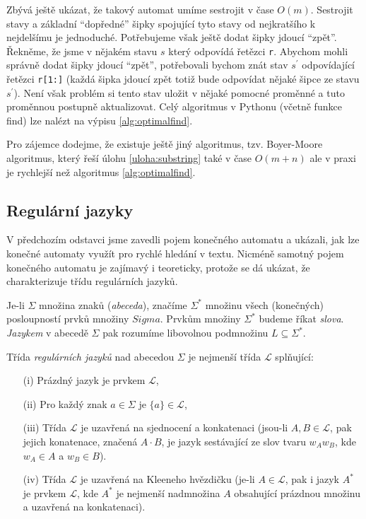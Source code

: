 Zbývá ještě ukázat, že takový automat umíme sestrojit v čase \(O(m)\).  Sestrojit stavy
a základní ``dopředné'' šipky spojující tyto stavy od nejkratšího k nejdelšímu je jednoduché.
Potřebujeme však ještě dodat šipky jdoucí ``zpět''.  Řekněme, že jsme  v nějakém stavu \(s\) 
který odpovídá řetězci {\tt r}. Abychom mohli správně dodat šipky jdoucí ``zpět'', potřebovali
bychom znát stav \(s^\prime\) odpovídající řetězci {\tt r[1:]} (každá šipka jdoucí zpět totiž bude 
odpovídat nějaké šipce ze stavu \(s^\prime\)). Není však problém si tento stav uložit v nějaké
pomocné proměnné a tuto proměnnou postupně aktualizovat.  Celý algoritmus v Pythonu
(včetně funkce find) lze nalézt na výpisu \ref{alg:optimalfind}.


Pro zájemce dodejme, že existuje ještě jiný algoritmus, tzv. Boyer-Moore algoritmus, 
který řeší úlohu \ref{uloha:substring} také v čase \(O(m+n)\) ale v praxi je rychlejší než 
algoritmus \ref{alg:optimalfind}.

\subsection*{Regulární jazyky}

V předchozím odstavci jsme zavedli pojem konečného automatu a ukázali, jak lze konečné
automaty využít pro rychlé hledání v textu. Nicméně samotný pojem konečného automatu 
je zajímavý i teoreticky, protože se dá ukázat, že charakterizuje třídu regulárních jazyků. 

\begin{definition} Je-li \(\Sigma\) množina znaků (\emph{abeceda}), značíme \(\Sigma^*\) množinu všech
(konečných) posloupností prvků množiny \(Sigma\). Prvkům množiny \(\Sigma^*\) budeme říkat
\emph{slova}.  \emph{Jazykem} v abecedě \(\Sigma\) pak rozumíme libovolnou podmnožinu \(L\subseteq\Sigma^*\).
\end{definition}

\begin{definition}  Třída \emph{regulárních jazyků} nad abecedou \(\Sigma\) je nejmenší třída \(\mathcal L\) splňující:
\begin{itemize}
  \item[(i)] Prázdný jazyk je prvkem \(\mathcal L\),
 \item[(ii)] Pro každý znak \(a\in\Sigma\) je \(\{a\}\in\mathcal L\),
 \item[(iii)] Třída \(\mathcal L\) je uzavřená na sjednocení a konkatenaci (jsou-li \(A,B\in\mathcal L\), pak jejich konatenace,
                     značená \(A\cdot B\), je jazyk sestávající ze slov tvaru \(w_Aw_B\), kde \(w_A\in A\) a \(w_B\in B\)).
 \item[(iv)] Třída \(\mathcal L\) je uzavřená na Kleeneho hvězdičku (je-li \(A\in\mathcal L\), pak i jazyk \(A^*\) je prvkem
                     \(\mathcal L\), kde \(A^*\) je nejmenší nadmnožina \(A\) obsahující prázdnou množinu a uzavřená na konkatenaci).
\end{itemize}
\end{definition}

